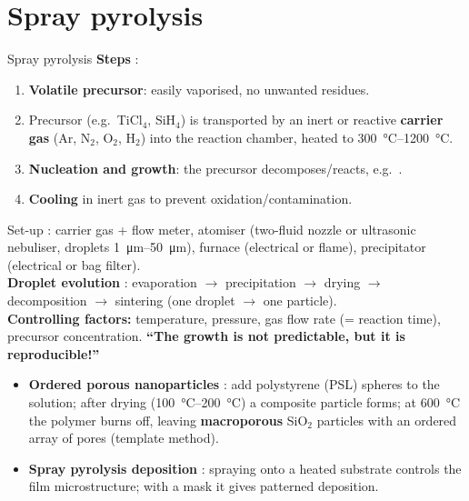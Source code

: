 \section{Spray pyrolysis}
\begin{cardbox}{Spray pyrolysis }
\textbf{Steps} :
\begin{enumerate}
  \item \textbf{Volatile precursor}: easily vaporised, no unwanted residues.
  \item Precursor (e.g.\ TiCl$_4$, SiH$_4$) is transported by an inert or reactive \textbf{carrier gas}
        (Ar, N$_2$, O$_2$, H$_2$) into the reaction chamber, heated to \SIrange{300}{1200}{\celsius}.
  \item \textbf{Nucleation and growth}: the precursor decomposes/reacts,
        e.g.\ .
  \item \textbf{Cooling} in inert gas to prevent oxidation/contamination.
\end{enumerate}
Set-up : carrier gas + flow meter, atomiser (two-fluid nozzle or ultrasonic nebuliser, droplets
\SIrange{1}{50}{\micro m}), furnace (electrical or flame), precipitator (electrical or bag filter).\\
\textbf{Droplet evolution} : evaporation $\to$ precipitation $\to$ drying $\to$ decomposition
$\to$ sintering (one droplet $\to$ one particle).\\
\textbf{Controlling factors:} temperature, pressure, gas flow rate (= reaction time), precursor concentration.
\textbf{``The growth is not predictable, but it is reproducible!''}
\end{cardbox}
\begin{itemize}
  \item \textbf{Ordered porous nanoparticles} : add polystyrene (PSL) spheres to the solution; after drying
        (\SIrange{100}{200}{\celsius}) a composite particle forms; at \SI{600}{\celsius} the polymer burns off,
        leaving \textbf{macroporous} SiO$_2$ particles with an ordered array of pores (template method).
  \item \textbf{Spray pyrolysis deposition} : spraying onto a heated substrate controls the film
        microstructure; with a mask it gives patterned deposition.
\end{itemize}

